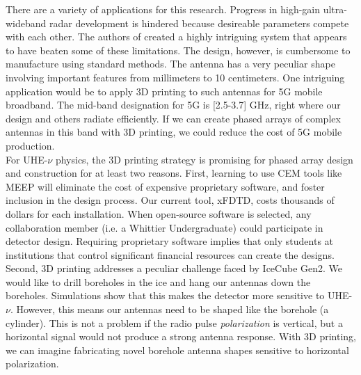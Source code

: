 \documentclass[../../../main.tex]{subfiles}
\begin{document}
There are a variety of applications for this research.  Progress in high-gain ultra-wideband radar development is hindered because desireable parameters compete with each other.  The authors of \cite{10.3390/electronics10121377} created a highly intriguing system that appears to have beaten some of these limitations.  The design, however, is cumbersome to manufacture using standard methods.  The antenna has a very peculiar shape involving important features from millimeters to 10 centimeters.  One intriguing application would be to apply 3D printing to such antennas for 5G mobile broadband.  The mid-band designation for 5G is [2.5-3.7] GHz, right where our design and others radiate efficiently.  If we can create phased arrays of complex antennas in this band with 3D printing, we could reduce the cost of 5G mobile production.
\\
\vspace{0.25cm}
For UHE-$\nu$ physics, the 3D printing strategy is promising for phased array design and construction for at least two reasons.  First, learning to use CEM tools like MEEP will eliminate the cost of expensive proprietary software, and foster inclusion in the design process.  Our current tool, xFDTD, costs thousands of dollars for each installation.  When open-source software is selected, any collaboration member (i.e. a Whittier Undergraduate) could participate in detector design.  Requiring proprietary software implies that only students at institutions that control significant financial resources can create the designs.  Second, 3D printing addresses a peculiar challenge faced by IceCube Gen2.  We would like to drill boreholes in the ice and hang our antennas down the boreholes.  Simulations show that this makes the detector more sensitive to UHE-$\nu$.  However, this means our antennas need to be shaped like the borehole (a cylinder).  This is not a problem if the radio pulse \textit{polarization} is vertical, but a horizontal signal would not produce a strong antenna response.  With 3D printing, we can imagine fabricating novel borehole antenna shapes sensitive to horizontal polarization.
\end{document}
